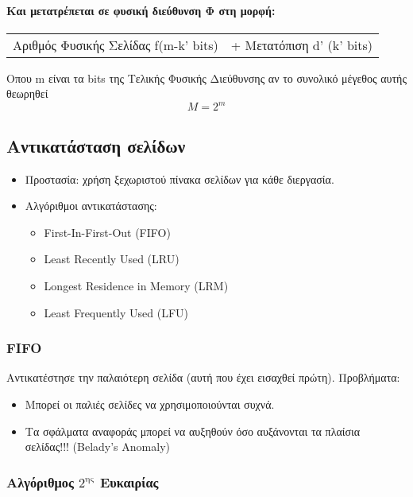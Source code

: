 \paragraph{Και μετατρέπεται σε φυσική διεύθυνση Φ στη μορφή:}

\begin{center}
\begin{tabularx}{0.95\textwidth}{XX}
Αριθμός Φυσικής Σελίδας f(m-k' bits) & + Μετατόπιση d' (k' bits)
\end{tabularx}
\end{center}

Οπου m είναι τα bits της Τελικής Φυσικής Διεύθυνσης αν το
συνολικό μέγεθος αυτής θεωρηθεί 
$$ M = 2^m $$

\subsection{Αντικατάσταση σελίδων}
\begin{itemize}
	\item	Προστασία: χρήση ξεχωριστού πίνακα σελίδων για κάθε διεργασία.
	\item	Αλγόριθμοι αντικατάστασης:
		\begin{itemize}
			\item	First-In-First-Out (FIFO)
			\item	Least Recently Used (LRU)
			\item	Longest Residence in Memory (LRM)
			\item	Least Frequently Used (LFU)
		\end{itemize}
\end{itemize}

\subsubsection{FIFO}

Αντικατέστησε την παλαιότερη σελίδα (αυτή που έχει εισαχθεί πρώτη).
Προβλήματα:
\begin{itemize}
	\item	Μπορεί οι παλιές σελίδες να χρησιμοποιούνται συχνά.
	\item	Τα σφάλματα αναφοράς μπορεί να αυξηθούν 
		όσο αυξάνονται τα πλαίσια σελίδας!!! (Belady’s Anomaly)
\end{itemize}

\subsubsection{Αλγόριθμος $2^\text{ης}$ Ευκαιρίας}

